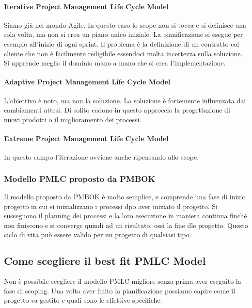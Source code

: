 \paragraph{Iterative Project Management Life Cycle Model}
Siamo già nel mondo Agile. In questo caso lo scope non si tocca e si definisce una sola volta, ma non si crea un piano unico iniziale. La pianificazione si esegue per esempio all'inizio di ogni sprint. Il problema è la definizione di un contratto col cliente che non è facilmente redigibile essendoci molta incertezza sulla soluzione. Si apprende meglio il dominio mano a mano che si crea l'implementazione.
\paragraph{Adaptive Project Management Life Cycle Model}
L'obiettivo è noto, ma non la soluzione. La soluzione è fortemente influenzata dai cambiamenti attesi. Di solito cadono in questo approccio la progettazione di nuovi prodotti o il miglioramento dei processi.
\paragraph{Extreme Project Management Life Cycle Model}
In questo campo l'iterazione avviene anche ripensando allo scope.
\subsubsection{Modello PMLC proposto da PMBOK}
Il modello proposto da PMBOK è molto semplice, e comprende una fase di inizio progetto in cui si inizializzano i processi dpo aver iniziato il progetto. Si susseguono il planning dei processi e la loro esecuzione in maniera continua finché non finiscono e si converge quindi ad un risultato, ossi la fine dle progetto. Questo ciclo di vita può essere valido per un progetto di qualsiasi tipo.
\subsection{Come scegliere il best fit PMLC Model}
Non è possibile scegliere il modello PMLC migliore senza prima aver eseguito la fase di scoping. Una volta aver finito la pianificazione possiamo capire come il progetto va gestito e quali sono le effettive specifiche.
